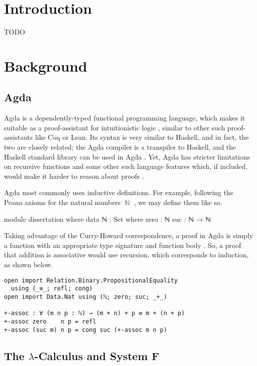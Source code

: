 \documentclass[logo,bsc,singlespacing,parskip,online]{infthesis}
\DeclareMathOperator{\nat}{\mathbb{N}}
\begin{document}
\chapter{Introduction}

TODO

\chapter{Background}

\section{Agda}
Agda is a dependently-typed functional programming language, which makes it
suitable as a proof-assistant for intuitionistic logic
\citep{norell_towards_2007}, similar to other such proof-assistants like Coq or
Lean. Its syntax is very similar to Haskell, and in fact, the two are closely
related; the Agda compiler is a transpiler to Haskell, and the Haskell standard
library can be used in Agda \citep{kusee_compiling_2017}. Yet, Agda has stricter
limitations on recursive functions and some other such language features which,
if included, would make it harder to reason about proofs
\citep{berghofer_brief_2009}.

Agda most commonly uses inductive definitions. For example, following the Peano
axioms for the natural numbers $\nat$ \citep{boolos_freges_1995}, we may define
them like so.

\begin{code}
module dissertation where
data ℕ : Set where
  zero : ℕ
  suc  : ℕ → ℕ
\end{code}


Taking advantage of the Curry-Howard correspondence, a proof in Agda is simply a
function with an appropriate type signature and function body
\citep{wadler_propositions_2015}. So, a proof that addition is associative would
use recursion, which corresponds to induction, as shown below.

\begin{verbatim}
open import Relation.Binary.PropositionalEquality
  using (_≡_; refl; cong)
open import Data.Nat using (ℕ; zero; suc; _+_)

+-assoc : ∀ (m n p : ℕ) → (m + n) + p ≡ m + (n + p)
+-assoc zero    n p = refl
+-assoc (suc m) n p = cong suc (+-assoc m n p)
\end{verbatim}

\section{The $\lambda$-Calculus and System F}
\end{document}
